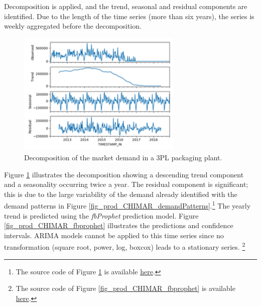 Decomposition is applied, and the trend, seasonal and residual components are identified. Due to the length of the time series (more than six years), the series is weekly aggregated before the decomposition. 

\begin{figure}[hbt!]
\centering
\includegraphics[width=0.7\textwidth]{sectionProduction/control_figures/fig_prod_CHIMAR_decompose.png}
\captionsetup{type=figure}
\caption{Decomposition of the market demand in a 3PL packaging plant.}
\label{fig_prod_CHIMAR_decompose}
\end{figure}

Figure \ref{fig_prod_CHIMAR_decompose} illustrates the decomposition showing a descending trend component and a seasonality occurring twice a year. The residual component is significant; this is due to the large variability of the demand already identified with the demand patterns in Figure \ref{fig_prod_CHIMAR_demandPatterns}.\footnote{The source code of Figure \ref{fig_prod_CHIMAR_decompose} is available \href{https://github.com/aletuf93/logproj/blob/master/examples/LOG_01\%20Demand\%20assessment.ipynb}{here}.} The yearly trend is predicted using the \textit{fbProphet} prediction model. Figure \ref{fig_prod_CHIMAR_fbprophet} illustrates the predictions and confidence intervals. ARIMA models cannot be applied to this time series since no transformation (square root, power, log, boxcox) leads to a stationary series. \footnote{The source code of Figure \ref{fig_prod_CHIMAR_fbprophet} is available \href{https://github.com/aletuf93/logproj/blob/master/examples/LOG_01\%20Demand\%20assessment.ipynb}{here}.}

